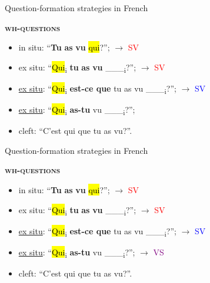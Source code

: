 \documentclass[lesson_slides]{subfiles}
\begin{document}
\begin{frame}[c]{Question-formation strategies in French}

    \noindent \textbf{\textsc{wh-questions}}
    \begin{itemize}
        \item[\ding{227}] in situ: “\textbf{Tu} \textbf{as} \textbf{vu} \hl{qui}?”; $\longrightarrow$ \textcolor{red}{SV}
        \item[\ding{227}] ex situ: “\hl{Qui}\textsubscript{i} \textbf{tu} \textbf{as} \textbf{vu} \_\_\_\textsubscript{i}?”;  $\longrightarrow$ \textcolor{red}{SV}
        \item[\ding{227}] \underline{ex situ}: “\hl{Qui}\textsubscript{i} \textbf{est-ce que} tu as vu \_\_\_\textsubscript{i}?”; $\longrightarrow$ \textcolor{blue}{SV}
        \item[\ding{227}] \underline{ex situ}: “\hl{Qui}\textsubscript{i} \textbf{as-tu} vu \_\_\_\textsubscript{i}?”;
        \item[\ding{227}] cleft: “C’est qui que tu as vu?”.
    \end{itemize}
   
\end{frame}
\begin{frame}[c]{Question-formation strategies in French}

    \noindent \textbf{\textsc{wh-questions}}
    \begin{itemize}
        \item[\ding{227}] in situ: “\textbf{Tu} \textbf{as} \textbf{vu} \hl{qui}?”; $\longrightarrow$ \textcolor{red}{SV}
        \item[\ding{227}] ex situ: “\hl{Qui}\textsubscript{i} \textbf{tu} \textbf{as} \textbf{vu} \_\_\_\textsubscript{i}?”;  $\longrightarrow$ \textcolor{red}{SV}
        \item[\ding{227}] \underline{ex situ}: “\hl{Qui}\textsubscript{i} \textbf{est-ce que} tu as vu \_\_\_\textsubscript{i}?”; $\longrightarrow$ \textcolor{blue}{SV}
        \item[\ding{227}] \underline{ex situ}: “\hl{Qui}\textsubscript{i} \textbf{as-tu} vu \_\_\_\textsubscript{i}?”; $\longrightarrow$ \textcolor{purple}{VS}
        \item[\ding{227}] cleft: “C’est qui que tu as vu?”.
    \end{itemize}
   
\end{frame}
\end{document}
